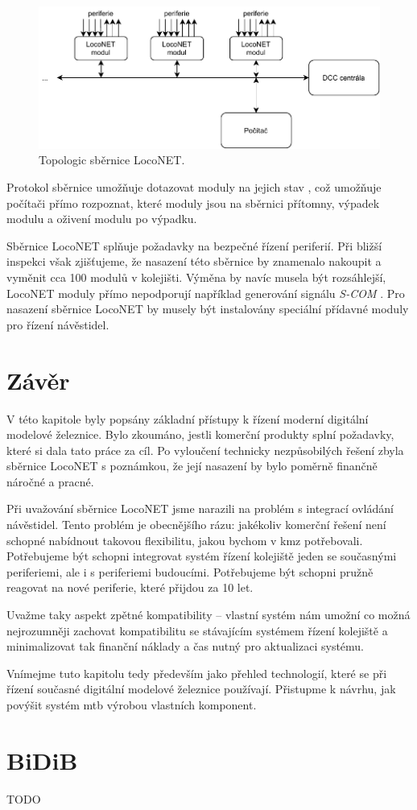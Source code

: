 \begin{figure}[ht!]
\includegraphics[width=\textwidth]{data/loconet.pdf}
\caption{Topologic sběrnice LocoNET.}
\label{fig:loconet-topology}
\end{figure}

Protokol sběrnice umožňuje dotazovat moduly na jejich stav \cite{loconet-specs},
což umožňuje počítači přímo rozpoznat, které moduly jsou na sběrnici přítomny,
výpadek modulu a oživení modulu po výpadku.

Sběrnice LocoNET splňuje požadavky na bezpečné řízení periferií. Při bližší
inspekci však zjišťujeme, že nasazení této sběrnice by znamenalo nakoupit a
vyměnit cca 100 modulů v kolejišti. Výměna by navíc musela být rozsáhlejší,
LocoNET moduly přímo nepodporují například generování signálu \textit{S-COM}
\cite{scom-specs}. Pro nasazení sběrnice LocoNET by musely být instalovány
speciální přídavné moduly pro řízení návěstidel.

\section{Závěr}

V této kapitole byly popsány základní přístupy k řízení moderní digitální
modelové železnice. Bylo zkoumáno, jestli komerční produkty splní požadavky,
které si dala tato práce za cíl. Po vyloučení technicky nezpůsobilých řešení
zbyla sběrnice LocoNET s poznámkou, že její nasazení by bylo poměrně finančně
náročné a pracné.

Při uvažování sběrnice LocoNET jsme narazili na problém s integrací ovládání
návěstidel. Tento problém je obecnějšího rázu: jakékoliv komerční řešení není
schopné nabídnout takovou flexibilitu, jakou bychom v \gls{kmz} potřebovali.
Potřebujeme být schopni integrovat systém řízení kolejiště jeden se současnými
periferiemi, ale i s periferiemi budoucími. Potřebujeme být schopni pružně
reagovat na nové periferie, které přijdou za 10 let.

Uvažme taky aspekt zpětné kompatibility – vlastní systém nám umožní co možná
nejrozumněji zachovat kompatibilitu se stávajícím systémem řízení kolejiště
a minimalizovat tak finanční náklady a čas nutný pro aktualizaci systému.

Vnímejme tuto kapitolu tedy především jako přehled technologií, které se
při řízení současné digitální modelové železnice používají. Přistupme k návrhu,
jak povýšit systém \gls{mtb} výrobou vlastních komponent.

\section{BiDiB}

TODO

